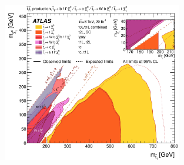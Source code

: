 \begin{figure}[!htb]
    \begin{center}
        \includegraphics[width=0.7\textwidth]{figures/search_stop2l/run1_stop_summary}
        \caption{
        }
        \label{fig:run1_stop_summary}
    \end{center}
\end{figure}

%
%
%
%
%
%
%
%
%
